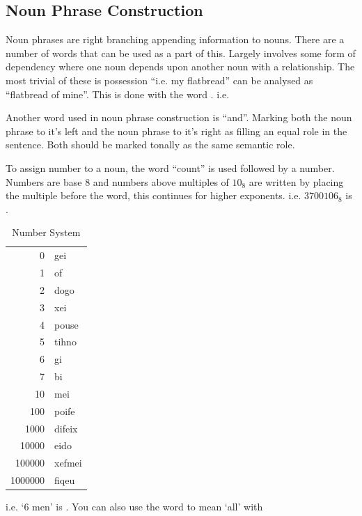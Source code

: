 \subsection{Noun Phrase Construction}

Noun phrases are right branching appending information to nouns. There are a number of words that can be used as a part of this. Largely involves some form of dependency where one noun depends upon another noun with a relationship. The most trivial of these is possession ``i.e. my flatbread'' can be analysed as ``flatbread of mine''. This is done with the word . i.e.

Another word used in noun phrase construction is  ``and''. Marking both the noun phrase to it's left and the noun phrase to it's right as filling an equal role in the sentence. Both should be marked tonally as the same semantic role.

To assign number to a noun, the word  ``count'' is used followed by a number. Numbers are base 8 and numbers above multiples of $10_8$ are written by placing the multiple before the word, this continues for higher exponents. i.e. $3 700 106_8$ is .


\begin{table}[H]
    \centering
    \begin{tabular}{r | l}
        0 & gei \\
        1 & \nU{}of \\
        2 & dogo \\
        3 & xei \\
        4 & pouse \\
        5 & tihno \\
        6 & gi \\
        7 & bi \\
        10 & mei \\
        100 & poife \\
        1000 & difeix \\
        10000 & \tU{}eido\sU{} \\
        100000 & xefmei \\
        1000000 & fiqeu
    \end{tabular}    
    \label{tab:number}
    \caption{Number System}
\end{table}

i.e. `6 men' is  . You can also use the word  to mean `all' with 

